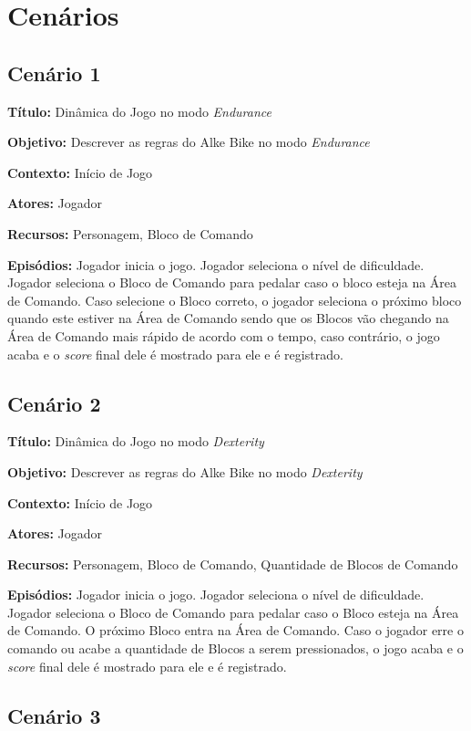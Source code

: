 \section{Cenários}
\subsection{Cenário 1}

\textbf{Título:} Dinâmica do Jogo no modo \textit{Endurance}

\textbf{Objetivo:} Descrever as regras do Alke Bike no modo \textit{Endurance}

\textbf{Contexto:} Início de Jogo

\textbf{Atores:} Jogador

\textbf{Recursos:} Personagem, Bloco de Comando

\textbf{Episódios:} Jogador inicia o jogo. Jogador seleciona o nível de dificuldade. Jogador seleciona o Bloco de Comando para pedalar caso o bloco esteja na Área de Comando. Caso selecione o Bloco correto, o jogador seleciona o próximo bloco quando este estiver na Área de Comando sendo que os Blocos vão chegando na Área de Comando mais rápido de acordo com o tempo, caso contrário, o jogo acaba e o \textit{score} final dele é mostrado para ele e é registrado.

\subsection{Cenário 2}

\textbf{Título:} Dinâmica do Jogo no modo \textit{Dexterity}

\textbf{Objetivo:} Descrever as regras do Alke Bike no modo \textit{Dexterity}

\textbf{Contexto:} Início de Jogo

\textbf{Atores:} Jogador

\textbf{Recursos:} Personagem, Bloco de Comando, Quantidade de Blocos de Comando

\textbf{Episódios:} Jogador inicia o jogo. Jogador seleciona o nível de dificuldade. Jogador seleciona o Bloco de Comando para pedalar caso o Bloco esteja na Área de Comando. O próximo Bloco entra na Área de Comando. Caso o jogador erre o comando ou acabe a quantidade de Blocos a serem pressionados, o jogo acaba e o \textit{score} final dele é mostrado para ele e é registrado.

\subsection{Cenário 3}

